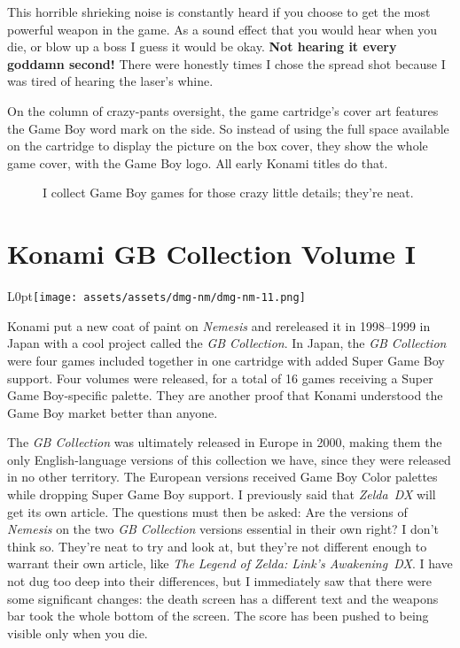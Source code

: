 \documentclass{book}
\begin{document}
This horrible shrieking noise is constantly heard if you choose to get the most powerful weapon in the game. As a sound effect that you would hear when you die, or blow up a boss I guess it would be okay. \textbf{Not hearing it every goddamn second!} There were honestly times I chose the spread shot because I was tired of hearing the laser’s whine.\par
On the column of crazy-pants oversight, the game cartridge’s cover art features the Game Boy word mark on the side. So instead of using the full space available on the cartridge to display the picture on the box cover, they show the whole game cover, with the Game Boy logo. All early Konami titles do that.\par
\FloatBarrier\vspace{\baselineskip}\begin{figure}[H]\caption*{I collect Game Boy games for those crazy little details; they’re neat.}\end{figure}
\FloatBarrier\section*{Konami GB Collection Volume I}
\begin{wrapfigure}{L}{0pt}{\texttt{[image: assets/assets/dmg-nm/dmg-nm-11.png]}}\end{wrapfigure}\noindent
Konami put a new coat of paint on \emph{Nemesis} and rereleased it in 1998–1999 in Japan with a cool project called the \emph{GB Collection}. In Japan, the \emph{GB Collection} were four games included together in one cartridge with added Super Game Boy support. Four volumes were released, for a total of 16 games receiving a Super Game Boy-specific palette. They are another proof that Konami understood the Game Boy market better than anyone.\par
The \emph{GB Collection} was ultimately released in Europe in 2000, making them the only English-language versions of this collection we have, since they were released in no other territory. The European versions received Game Boy Color palettes while dropping Super Game Boy support. I previously said that \emph{Zelda~DX} will get its own article. The questions must then be asked: Are the versions of \emph{Nemesis} on the two \emph{GB Collection} versions essential in their own right? I don’t think so. They’re neat to try and look at, but they’re not different enough to warrant their own article, like \emph{The Legend of Zelda: Link’s Awakening~DX}. I have not dug too deep into their differences, but I immediately saw that there were some significant changes: the death screen has a different text and the weapons bar took the whole bottom of the screen. The score has been pushed to being visible only when you die.\par
\end{document}
